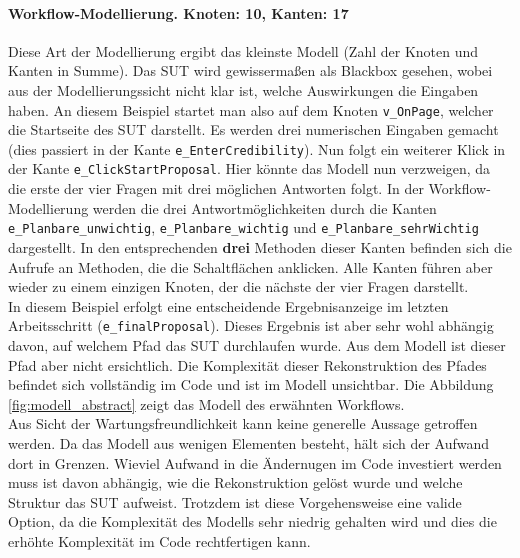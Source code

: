 \paragraph{Workflow-Modellierung. Knoten: 10, Kanten: 17}
Diese Art der Modellierung ergibt das kleinste Modell (Zahl der Knoten und Kanten in Summe). Das \Gls{SUT} wird gewissermaßen als Blackbox gesehen, wobei aus der Modellierungssicht nicht klar ist, welche Auswirkungen die Eingaben haben. An diesem Beispiel startet man also auf dem Knoten \texttt{v\_OnPage}, welcher die Startseite des \Gls{SUT} darstellt. Es werden drei numerischen Eingaben gemacht (dies passiert in der Kante \texttt{e\_EnterCredibility}). Nun folgt ein weiterer Klick in der Kante \linebreak \texttt{e\_ClickStartProposal}. Hier könnte das Modell nun verzweigen, da die erste der vier Fragen mit drei möglichen Antworten folgt. In der Workflow-Modellierung werden die drei Antwortmöglichkeiten durch die Kanten \texttt{e\_Planbare\_unwichtig}, \texttt{e\_Planbare\_wichtig} und \texttt{e\_Planbare\_sehrWichtig} dargestellt. In den entsprechenden \textbf{drei} Methoden dieser Kanten befinden sich die Aufrufe an Methoden, die die Schaltflächen anklicken. Alle Kanten führen aber wieder zu einem einzigen Knoten, der die nächste der vier Fragen darstellt.\\
In diesem Beispiel erfolgt eine entscheidende Ergebnisanzeige im letzten Arbeitsschritt \linebreak (\texttt{e\_finalProposal}). Dieses Ergebnis ist aber sehr wohl abhängig davon, auf welchem Pfad das \Gls{SUT} durchlaufen wurde. Aus dem Modell ist dieser Pfad aber nicht ersichtlich. Die Komplexität dieser Rekonstruktion des Pfades befindet sich vollständig im Code und ist im Modell unsichtbar. Die Abbildung \ref{fig:modell_abstract} zeigt das Modell des erwähnten Workflows.\\
Aus Sicht der Wartungsfreundlichkeit kann keine generelle Aussage getroffen werden. Da das Modell aus wenigen Elementen besteht, hält sich der Aufwand dort in Grenzen. Wieviel Aufwand in die Ändernugen im Code investiert werden muss ist davon abhängig, wie die Rekonstruktion gelöst wurde und welche Struktur das \Gls{SUT} aufweist. Trotzdem ist diese Vorgehensweise eine valide Option, da die Komplexität des Modells sehr niedrig gehalten wird und dies die erhöhte Komplexität im Code rechtfertigen kann.

